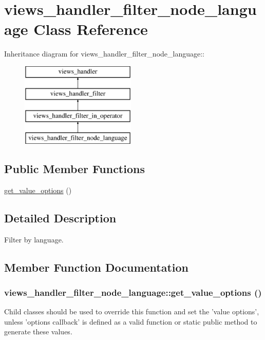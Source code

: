 \hypertarget{classviews__handler__filter__node__language}{
\section{views\_\-handler\_\-filter\_\-node\_\-language Class Reference}
\label{classviews__handler__filter__node__language}
}
Inheritance diagram for views\_\-handler\_\-filter\_\-node\_\-language::\begin{figure}[H]
\begin{center}
\leavevmode
\includegraphics[height=4cm]{classviews__handler__filter__node__language}
\end{center}
\end{figure}
\subsection*{Public Member Functions}
\begin{DoxyCompactItemize}
\item 
\hyperlink{classviews__handler__filter__node__language_afa97fc909a4394a9a69cd02e952afb66}{get\_\-value\_\-options} ()
\end{DoxyCompactItemize}


\subsection{Detailed Description}
Filter by language. 

\subsection{Member Function Documentation}
\hypertarget{classviews__handler__filter__node__language_afa97fc909a4394a9a69cd02e952afb66}{
\subsubsection[{get\_\-value\_\-options}]{\setlength{\rightskip}{0pt plus 5cm}views\_\-handler\_\-filter\_\-node\_\-language::get\_\-value\_\-options ()}}
\label{classviews__handler__filter__node__language_afa97fc909a4394a9a69cd02e952afb66}
Child classes should be used to override this function and set the 'value options', unless 'options callback' is defined as a valid function or static public method to generate these values.

